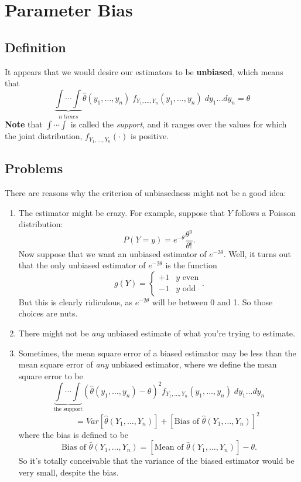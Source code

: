 \documentclass[a4paper,12pt]{scrartcl}
\begin{document}
\section{Parameter Bias}

\subsection{Definition}

It appears that we would desire our estimators to be \textbf{unbiased},
which means that
   \[ \underbrace{\int \cdots \int}_{n\; times} 
      \hat{\theta}(y_1,\ldots,y_n) \;
      f_{Y_1,\ldots,Y_n}(y_1,\ldots,y_n) \; dy_1 \ldots dy_n = \theta \]
\textbf{Note} that $\int \cdots \int$ is called the \emph{support}, 
and it ranges over the values for which the joint distribution,
$f_{Y_1,\ldots,Y_n}(\cdot)$ is positive.

\subsection{Problems}

There are reasons why the criterion of unbiasedness might not be a good
idea:
\begin{enumerate}
   \item{The estimator might be crazy.  For example, suppose that $Y$
      follows a Poisson distribution: 
	 \[ P(Y=y) = e^{-\theta} \frac{\theta^y}{\theta!}.\]
      Now suppose that we want an unbiased estimator of $e^{-2\theta}$.
      Well, it turns out that the only unbiased estimator of 
      $e^{-2\theta}$ is the function
	 \[ g(Y) = \begin{cases} +1 & \text{$y$ even} \\
	       -1 & \text{$y$ odd} \end{cases}.\]
      But this is clearly ridiculous, as $e^{-2\theta}$ will be between
      0 and 1. So those choices are nuts.
      } 
   \item{There might not be \emph{any} unbiased estimate of what you're
      trying to estimate.}
   \item{Sometimes, the mean square error of a biased estimator may be 
      less than the mean square error of \emph{any} unbiased
      estimator, where we define the mean square error to be
      \[ \underbrace{\int \cdots \int}_{\text{the support}}
	 \left( \hat{\theta}(y_1, \ldots, y_n) - \theta\right)^2
	 f_{Y_1,\ldots, Y_n}(y_1,\ldots,y_n)\; dy_1\ldots dy_n \]
      \[\qquad = Var\left[\hat{\theta}(Y_1,\ldots,Y_n)\right]
	 + [\text{Bias of } \hat{\theta}(Y_1,\ldots,Y_n)]^2 \]
      where the bias is defined to be 
      \[ \text{Bias of } \hat{\theta}(Y_1,\ldots,Y_n) = 
	 [\text{Mean of } \hat{\theta}(Y_1,\ldots,Y_n)] - \theta.\]
      So it's totally conceivable that the variance of the biased
      estimator would be very small, despite the bias.
   }
\end{enumerate}
\end{document}
